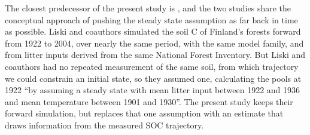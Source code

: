 \documentclass[11pt]{article}
\begin{document}
The closest predecessor of the present study is \citet{Liski2006}, and the two studies
share the conceptual approach of pushing the steady state assumption as far back in time as possible. Liski and coauthors simulated the soil C of Finland's forests
forward from 1922 to 2004, over nearly the same period, with the
same model family, and from litter inputs derived from the same National Forest
Inventory. But Liski and coauthors had no repeated measurement of
the same soil, from which trajectory we could constrain an initial state, so they assumed one,
calculating the pools at 1922 ``by assuming a steady state with mean litter input between
1922 and 1936 and mean temperature between 1901 and 1930''. The present study keeps their
forward simulation, but replaces that one assumption with an estimate that draws information from the measured SOC trajectory.
\end{document}
